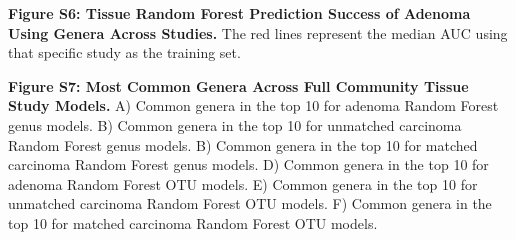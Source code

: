 \documentclass[12pt,]{article}
\begin{document}
\textbf{Figure S6: Tissue Random Forest Prediction Success of Adenoma
Using Genera Across Studies.} The red lines represent the median AUC
using that specific study as the training set.

\textbf{Figure S7: Most Common Genera Across Full Community Tissue Study
Models.} A) Common genera in the top 10 for adenoma Random Forest genus
models. B) Common genera in the top 10 for unmatched carcinoma Random
Forest genus models. B) Common genera in the top 10 for matched
carcinoma Random Forest genus models. D) Common genera in the top 10 for
adenoma Random Forest OTU models. E) Common genera in the top 10 for
unmatched carcinoma Random Forest OTU models. F) Common genera in the
top 10 for matched carcinoma Random Forest OTU models.

\newpage
\end{document}
